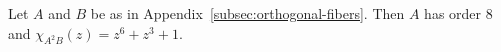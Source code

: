 Let $A$ and $B$ be as in Appendix~\ref{subsec:orthogonal-fibers}. Then $A$ has order $8$ and $\chi_{A^2B}(z)=z^6+z^3+1$.
